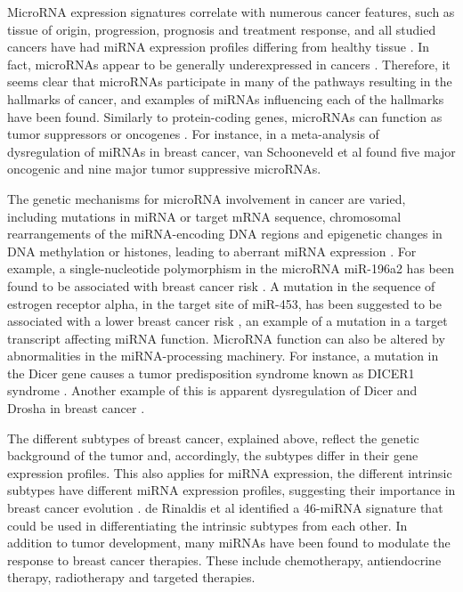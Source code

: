 MicroRNA expression signatures correlate with numerous cancer features, such
as tissue of origin, progression, prognosis and treatment response, and all
studied cancers have had miRNA expression profiles differing from healthy
tissue \citep{Calin2006}. In fact, microRNAs appear to be generally underexpressed in
cancers \citep{Lu2005}. Therefore, it seems clear that microRNAs participate
in many of the pathways resulting in the hallmarks of cancer, and examples of
miRNAs influencing each of the hallmarks have been found. Similarly to
protein-coding genes, microRNAs can function as tumor suppressors or oncogenes
\citep{Lin2015}. For instance, in a meta-analysis of dysregulation of miRNAs
in breast cancer, van Schooneveld et al \citep{vanSchooneveld2015} found five
major oncogenic and nine major tumor suppressive microRNAs.


The genetic mechanisms for microRNA involvement in cancer are varied,
including mutations in miRNA or target mRNA sequence, chromosomal
rearrangements of the miRNA-encoding DNA regions and epigenetic changes in DNA
methylation or histones, leading to aberrant miRNA expression
\citep{Calin2006,Melo2011}. For example, a single-nucleotide polymorphism
in the microRNA miR-196a2 has been found to be associated with breast cancer
risk \citep{Gao2011}. A mutation in the sequence of estrogen receptor alpha,
in the target site of miR-453, has been suggested to be associated with a
lower breast cancer risk \citep{Tchatchou2009}, an example of a mutation in
a target transcript affecting miRNA function. MicroRNA function can also be
altered by abnormalities in the miRNA-processing machinery. For instance, a
mutation in the Dicer gene causes a tumor predisposition syndrome known as
DICER1 syndrome \citep{Slade2011}. Another example of this is apparent
dysregulation of Dicer and Drosha in breast cancer \citep{Yan2012}.

The different subtypes of breast cancer, explained above, reflect the genetic
background of the tumor and, accordingly, the subtypes differ in their gene
expression profiles. This also applies for miRNA expression, the different
intrinsic subtypes have different miRNA expression profiles, suggesting their
importance in breast cancer evolution \citep{Blenkiron2007}.
de Rinaldis et al \citep{deRinaldis2013}
identified a 46-miRNA signature that could be used in differentiating the
intrinsic subtypes from each other. In addition to
tumor development, many miRNAs have been found to modulate the response to
breast cancer therapies. These include chemotherapy, antiendocrine therapy,
radiotherapy and targeted therapies.

